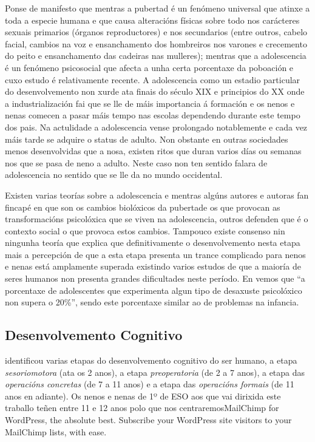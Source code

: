 Ponse de manifesto que mentras a pubertad é un fenómeno universal que atinxe a toda a especie humana e que causa alteracións físicas sobre todo nos carácteres sexuais primarios (órganos reproductores) e nos secundarios (entre outros, cabelo facial, cambios na voz e ensanchamento dos hombreiros nos varones e crecemento do peito e ensanchamento das cadeiras nas mulleres); mentras que a adolescencia é un fenómeno psicosocial que afecta a unha certa porcentaxe da poboación e cuxo estudo é relativamente recente. A adolescencia como un estadio particular do desenvolvemento non xurde ata finais do século XIX e principios do XX onde a industrialización fai que se lle de máis importancia á formación e os nenos e nenas comecen a pasar máis tempo nas escolas dependendo durante este tempo dos pais. Na actulidade a adolescencia vense prolongado notablemente e cada vez máis tarde se adquire o status de adulto. Non obstante en outras sociedades menos desenvolvidas que a nosa, existen ritos que duran varios días ou semanas nos que se pasa de neno a adulto. Neste caso non ten sentido falara de adolescencia no sentido que se lle da no mundo occidental.

Existen varias teorías sobre a adolescencia e mentras algúns autores e autoras fan fincapé  en que son os cambios biolóxicos da pubertade os que provocan as transformacións psicolóxica que se viven na adolescencia, outros defenden que é o contexto social o que provoca estos cambios. Tampouco existe consenso nin ningunha teoría que explica que definitivamente o desenvolvemento nesta etapa mais a percepción de que a esta etapa presenta un trance complicado para nenos e nenas está amplamente superada existindo varios estudos de que a maioría de seres humanos non presenta grandes dificultades neste período. En \cite[p.~440]{coll1990desarrollo} vemos que ``a porcentaxe de adolescentes que experimenta algun tipo de desaxuste psicolóxico non supera o 20\%'', sendo este porcentaxe similar ao de problemas na infancia.

\subsection{Desenvolvemento Cognitivo}
 identificou varias etapas do desenvolvemento cognitivo do ser humano, a etapa \emph{sesoriomotora} (ata os 2 anos), a etapa \emph{preoperatoria} (de 2 a 7 anos), a etapa das \emph{operacións concretas} (de 7 a 11 anos) e a etapa das \emph{operacións formais} (de 11 anos en adiante). Os nenos e nenas de 1º de ESO aos que vai dirixida este traballo teñen entre 11 e 12 anos polo que nos centraremosMailChimp for WordPress, the absolute best. Subscribe your WordPress site visitors to your MailChimp lists, with ease.

